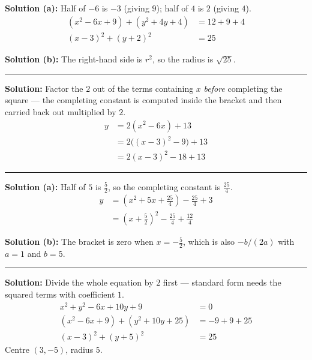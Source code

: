 \documentclass[12pt]{article}
\begin{document}

\textbf{Solution (a):} Half of $-6$ is $-3$ (giving $9$); half of $4$ is $2$ (giving $4$).
\begin{align*}
  (x^2 - 6x + 9) + (y^2 + 4y + 4) &= 12 + 9 + 4 \\
  (x - 3)^2 + (y + 2)^2 &= 25
\end{align*}

\textbf{Solution (b):} The right-hand side is $r^2$, so the radius is $\sqrt{25}$. 

\vspace{0.2cm}\noindent\rule{\linewidth}{0.2pt}


\textbf{Solution:} Factor the $2$ out of the terms containing $x$ \emph{before} completing
the square --- the completing constant is computed inside the bracket and then carried back
out multiplied by $2$.
\begin{align*}
  y &= 2(x^2 - 6x) + 13 \\
    &= 2\bigl((x - 3)^2 - 9\bigr) + 13 \\
    &= 2(x - 3)^2 - 18 + 13
\end{align*}

\vspace{0.2cm}\noindent\rule{\linewidth}{0.2pt}


\textbf{Solution (a):} Half of $5$ is $\tfrac{5}{2}$, so the completing constant is
$\tfrac{25}{4}$.
\begin{align*}
  y &= \left(x^2 + 5x + \frac{25}{4}\right) - \frac{25}{4} + 3 \\
    &= \left(x + \frac{5}{2}\right)^2 - \frac{25}{4} + \frac{12}{4}
\end{align*}

\textbf{Solution (b):} The bracket is zero when $x = -\tfrac{5}{2}$, which is also
$-b/(2a)$ with $a = 1$ and $b = 5$. 

\vspace{0.2cm}\noindent\rule{\linewidth}{0.2pt}


\textbf{Solution:} Divide the whole equation by $2$ first --- standard form needs the squared
terms with coefficient $1$.
\begin{align*}
  x^2 + y^2 - 6x + 10y + 9 &= 0 \\
  (x^2 - 6x + 9) + (y^2 + 10y + 25) &= -9 + 9 + 25 \\
  (x - 3)^2 + (y + 5)^2 &= 25
\end{align*}
Centre $(3, -5)$, radius $5$. 
\end{document}
